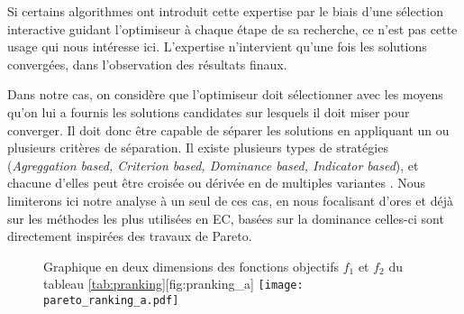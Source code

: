 Si certains algorithmes ont introduit cette expertise par le biais d'une sélection interactive guidant l'optimiseur à chaque étape de sa recherche, ce n'est pas cette usage qui nous intéresse ici. L'expertise n'intervient qu'une fois les solutions convergées, dans l'observation des résultats finaux.

Dans notre cas, on considère que l'optimiseur doit sélectionner avec les moyens qu'on lui a fournis les solutions candidates sur lesquels il doit miser pour converger. Il doit donc être capable de séparer les solutions en appliquant un ou plusieurs critères de séparation. Il existe plusieurs types de stratégies (\textit{Agreggation based, Criterion based, Dominance based, Indicator based}), et chacune d'elles peut être croisée ou dérivée en de multiples variantes \autocites[28]{Zitzler1999a, Deb2001}[7]{Liefooghe2009}. Nous limiterons ici notre analyse à un seul de ces cas, en nous focalisant d'ores et déjà sur les méthodes les plus utilisées en EC, basées sur la dominance celles-ci sont directement inspirées des travaux de Pareto.


\begin{figure}[!htbp]
	\begin{sidecaption}[fortoc]{Graphique en deux dimensions des fonctions objectifs $f_1$ et $f_2$ du tableau \ref{tab:pranking}}[fig:pranking_a]
		\centering  	
		\texttt{[image: pareto\_ranking\_a.pdf]}
	 \end{sidecaption}
\end{figure}

